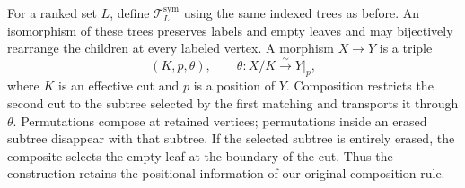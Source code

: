 \documentclass[11pt,a4paper]{article}
\theoremstyle{plain}
\theoremstyle{definition}
\theoremstyle{remark}
\begin{document}
For a ranked set $L$, define $\mathcal T_L^{\mathrm{sym}}$ using the
same indexed trees as before. An isomorphism of these trees preserves
labels and empty leaves and may bijectively rearrange the children
at every labeled vertex. A morphism $X\to Y$ is a triple
\begin{equation}\label{concl:symmetric-matching}
 (K,p,\theta),\qquad
 \theta:X/K\xrightarrow{\sim}Y|_p,
\end{equation}
where $K$ is an effective cut and $p$ is a position of $Y$.
Composition restricts the second cut to the subtree selected by the
first matching and transports it through $\theta$. Permutations
compose at retained vertices; permutations inside an erased subtree
disappear with that subtree. If the selected subtree is entirely
erased, the composite selects the empty leaf at the boundary of the
cut. Thus the construction retains the positional information of
our original composition rule.
\end{document}
